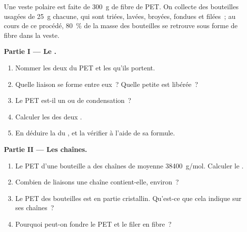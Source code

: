 \begin{problem}
\label{pb:g12:polymers:1}
Une veste polaire est faite de \qty{300}{g} de fibre de PET. On collecte
des bouteilles usagées de
\qty{25}{g} chacune, qui sont triées, lavées, broyées, fondues et
filées~; au cours de ce procédé, \qty{80}{\percent} de la masse des
bouteilles se retrouve sous forme de fibre dans la veste.

\medskip
\noindent\textbf{Partie I --- Le .}
\begin{enumerate}
  \item Nommer les deux  du PET et les 
        qu'ils portent.
  \item Quelle liaison se forme entre eux~? Quelle petite  est
        libérée~?
  \item Le PET est-il un  ou de condensation~?
  \item Calculer les  des deux .
  \item En déduire la  du  , et la
        vérifier à l'aide de sa formule.
\end{enumerate}

\medskip
\noindent\textbf{Partie II --- Les chaînes.}
\begin{enumerate}[resume]
  \item Le PET d'une bouteille a des chaînes de  moyenne
        \qty{38400}{g/mol}. Calculer le .
  \item Combien de liaisons  une chaîne contient-elle, environ~?
  \item Le PET des bouteilles est en partie cristallin. Qu'est-ce que
        cela indique sur ses chaînes~?
  \item Pourquoi peut-on fondre le PET et le filer en fibre~?
\end{enumerate}


\end{problem}
